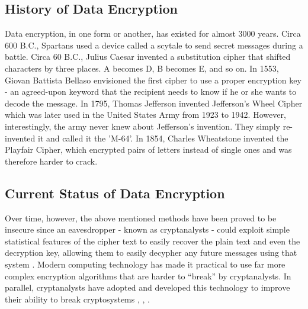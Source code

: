 \documentclass[journal]{IEEEtran}
\begin{document}
\subsection{\textbf{History of Data Encryption}}
Data encryption, in one form or another, has existed for almost 3000 years. Circa 600 B.C., Spartans used a device called a scytale to send secret messages during a battle. Circa 60 B.C., Julius Caesar invented a substitution cipher that shifted characters by three places. A becomes D, B becomes E, and so on. In 1553, Giovan Battista Bellaso envisioned the first cipher to use a proper encryption key - an agreed-upon keyword that the recipient needs to know if he or she wants to decode the message. In 1795, Thomas Jefferson invented Jefferson's Wheel Cipher which was later used in the United States Army from 1923 to 1942. However, interestingly, the army never knew about Jefferson's invention. They simply re-invented it and called it the 'M-64'. In 1854, Charles Wheatstone invented the Playfair Cipher, which encrypted pairs of letters instead of single ones and was therefore harder to crack.

\subsection{\textbf{Current Status of Data Encryption}}
Over time, however, the above mentioned methods have been proved to be insecure since an eavesdropper - known as cryptanalysts - could exploit simple statistical features of the cipher text to easily recover the plain text and even the decryption key, allowing them to easily decypher any future messages using that system \cite{encryption_today}. Modern computing technology has made it practical to use far more complex encryption algorithms that are harder to “break” by cryptanalysts. In parallel, cryptanalysts have adopted and developed this technology to improve their ability to break cryptosystems \cite{des_cryptanalysis}, \cite{rijndael_cryptanalysis}, \cite{rsa_cryptanalysis}. 
\end{document}
